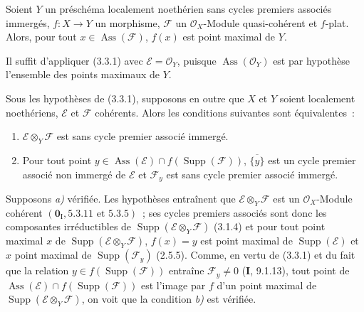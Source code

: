 \begin{corollary}[3.3.2]
\label{IV.2.3.3.2-fr}
Soient $Y$ un préschéma localement noethérien sans cycles premiers associés
immergés, $f:X\to Y$ un morphisme, $\mathcal F$ un $\mathcal O_X$-Module
quasi-cohérent et $f$-plat. Alors, pour tout
$x\in\operatorname{Ass}(\mathcal F)$, $f(x)$ est point maximal de $Y$.
\end{corollary}

Il suffit d'appliquer (3.3.1) avec $\mathcal E=\mathcal O_Y$, puisque
$\operatorname{Ass}(\mathcal O_Y)$ est par hypothèse l'ensemble des points
maximaux de $Y$.

\begin{corollary}[3.3.3]
\label{IV.2.3.3.3-fr}
Sous les hypothèses de \textup{(3.3.1)}, supposons en outre que $X$ et $Y$ soient
localement noethériens, $\mathcal E$ et $\mathcal F$ cohérents. Alors les
conditions suivantes sont équivalentes~:
\begin{enumerate}
\item[\emph{a)}] $\mathcal E\otimes_Y\mathcal F$ est sans cycle premier
associé immergé.
\item[\emph{b)}] Pour tout point
$y\in\operatorname{Ass}(\mathcal E)\cap f(\operatorname{Supp}(\mathcal F))$,
$\overline{\{y\}}$ est un cycle premier associé non immergé de $\mathcal E$ et
$\mathcal F_y$ est sans cycle premier associé immergé.
\end{enumerate}
\end{corollary}

Supposons \emph{a)} vérifiée. Les hypothèses entraînent que
$\mathcal E\otimes_Y\mathcal F$ est un $\mathcal O_X$-Module cohérent
$(\mathbf{0}_{\mathrm I},5.3.11\text{ et }5.3.5)$~; ses cycles premiers associés sont
donc les composantes irréductibles de
$\operatorname{Supp}(\mathcal E\otimes_Y\mathcal F)$ (3.1.4) et pour tout
point maximal $x$ de $\operatorname{Supp}(\mathcal E\otimes_Y\mathcal F)$,
$f(x)=y$ est point maximal de $\operatorname{Supp}(\mathcal E)$ et $x$ point
maximal de $\operatorname{Supp}(\mathcal F_y)$ (2.5.5). Comme, en vertu de
(3.3.1) et du fait que la relation
$y\in f(\operatorname{Supp}(\mathcal F))$ entraîne $\mathcal F_y\ne0$
(\textbf{I}, 9.1.13), tout point de
$\operatorname{Ass}(\mathcal E)\cap f(\operatorname{Supp}(\mathcal F))$ est
l'image par $f$ d'un point maximal de
$\operatorname{Supp}(\mathcal E\otimes_Y\mathcal F)$, on voit que la condition
\emph{b)} est vérifiée.

